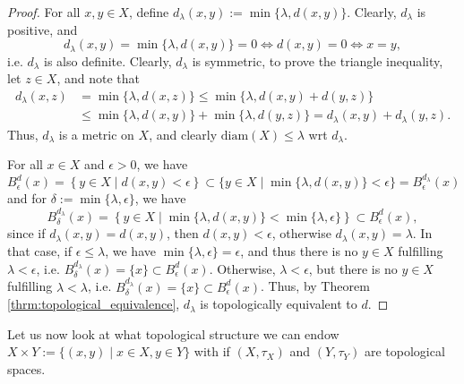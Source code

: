 \begin{proof}
	For all $x, y\in X$, define $d_{\lambda}(x, y) := \min\{\lambda, d(x, y)\}$. Clearly, $d_{\lambda}$ is positive, and $$d_{\lambda}(x, y) = \min\{\lambda, d(x, y)\} = 0\Leftrightarrow d(x, y) = 0\Leftrightarrow x = y,$$ i.e. $d_{\lambda}$ is also definite.
	Clearly, $d_{\lambda}$ is symmetric, to prove the triangle inequality, let $z\in X$, and note that
	\begin{align*}
		d_{\lambda}(x, z) &= \min\{\lambda, d(x, z)\} \leq \min\{ \lambda, d(x, y) + d(y, z) \} \\ &\leq \min\{\lambda, d(x, y)\} + \min\{\lambda, d(y, z)\} = d_{\lambda}(x, y) + d_{\lambda}(y, z).
	\end{align*}
	Thus, $d_{\lambda}$ is a metric on $X$, and clearly $\text{diam}(X)\leq\lambda$ wrt $d_{\lambda}$. 
	
	For all $x\in X$ and $\epsilon > 0$, we have 
	$$B^{d}_{\epsilon}(x)  = \left\{y\in X\mid d(x, y) < \epsilon\right\} \subset \{y\in X\mid \min\{\lambda, d(x, y)\} < \epsilon\} = B_{\epsilon}^{d_{\lambda}}(x)$$
	and for $\delta := \min\{\lambda, \epsilon\}$, we have
	$$B^{d_{\lambda}}_{\delta}(x) = \left\{y\in X\mid \min\{\lambda, d(x, y)\} < \min\{\lambda, \epsilon\}\right\} \subset B^{d}_{\epsilon}(x),$$
	since if $d_{\lambda}(x, y) = d(x, y)$, then $d(x, y) < \epsilon$, otherwise $d_{\lambda}(x, y) = \lambda$. In that case, if $\epsilon\leq \lambda$, we have $\min\{\lambda, \epsilon\} = \epsilon$, and thus there is no $y\in X$ fulfilling $\lambda < \epsilon$, i.e. $B_{\delta}^{d_{\lambda}}(x) = \{x\}\subset B_{\epsilon}^{d}(x)$. Otherwise, $\lambda < \epsilon$, but there is no $y\in X$ fulfilling $\lambda < \lambda$, i.e. $B_{\delta}^{d_{\lambda}}(x) = \{x\}\subset B_{\epsilon}^{d}(x)$. Thus, by Theorem \ref{thrm:topological_equivalence}, $d_{\lambda}$ is topologically equivalent to $d$.
\end{proof}

Let us now look at what topological structure we can endow $X\times Y := \{ (x, y) \mid x\in X, y\in Y \}$ with if $(X, \tau_X)$ and $(Y, \tau_Y)$ are topological spaces.

